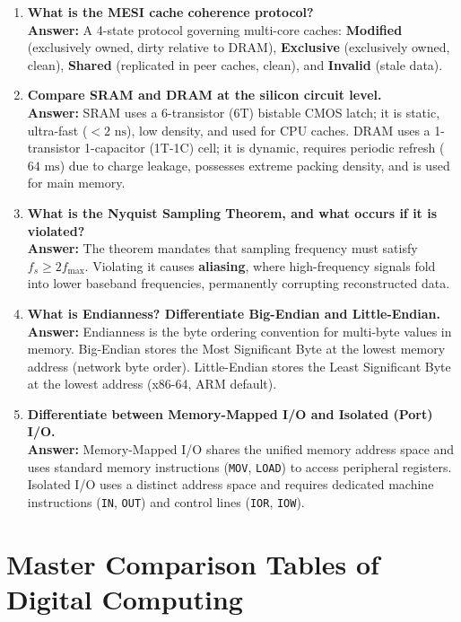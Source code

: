 \begin{enumerate}[label=\bfseries Q\arabic*.]
    \item \textbf{What is the MESI cache coherence protocol?} \\
    \textbf{Answer:} A 4-state protocol governing multi-core caches: \textbf{Modified} (exclusively owned, dirty relative to DRAM), \textbf{Exclusive} (exclusively owned, clean), \textbf{Shared} (replicated in peer caches, clean), and \textbf{Invalid} (stale data).

    \item \textbf{Compare SRAM and DRAM at the silicon circuit level.} \\
    \textbf{Answer:} SRAM uses a 6-transistor (6T) bistable CMOS latch; it is static, ultra-fast ($<2\text{ ns}$), low density, and used for CPU caches. DRAM uses a 1-transistor 1-capacitor (1T-1C) cell; it is dynamic, requires periodic refresh ($64\text{ ms}$) due to charge leakage, possesses extreme packing density, and is used for main memory.

    \item \textbf{What is the Nyquist Sampling Theorem, and what occurs if it is violated?} \\
    \textbf{Answer:} The theorem mandates that sampling frequency must satisfy $f_s \ge 2 f_{\text{max}}$. Violating it causes \textbf{aliasing}, where high-frequency signals fold into lower baseband frequencies, permanently corrupting reconstructed data.

    \item \textbf{What is Endianness? Differentiate Big-Endian and Little-Endian.} \\
    \textbf{Answer:} Endianness is the byte ordering convention for multi-byte values in memory. Big-Endian stores the Most Significant Byte at the lowest memory address (network byte order). Little-Endian stores the Least Significant Byte at the lowest address (x86-64, ARM default).

    \item \textbf{Differentiate between Memory-Mapped I/O and Isolated (Port) I/O.} \\
    \textbf{Answer:} Memory-Mapped I/O shares the unified memory address space and uses standard memory instructions (\texttt{MOV}, \texttt{LOAD}) to access peripheral registers. Isolated I/O uses a distinct address space and requires dedicated machine instructions (\texttt{IN}, \texttt{OUT}) and control lines (\texttt{IOR}, \texttt{IOW}).
\end{enumerate}


\section{Master Comparison Tables of Digital Computing}
\label{sec:master_comparison_tables}

